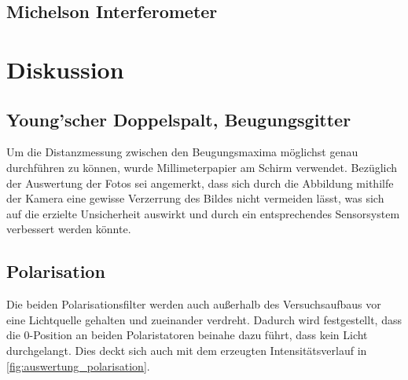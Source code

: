 \documentclass[12pt,english,ngerman]{scrartcl}
\begin{document}

\subsection{Michelson Interferometer}


\section{Diskussion}\label{sec:diskussion}

\subsection{Young'scher Doppelspalt, Beugungsgitter}

Um die Distanzmessung zwischen den Beugungsmaxima möglichst genau durchführen zu können, wurde Millimeterpapier am Schirm 
verwendet. Bezüglich der Auswertung der Fotos sei angemerkt, dass sich durch die Abbildung mithilfe der Kamera eine gewisse 
Verzerrung des Bildes nicht vermeiden lässt, was sich auf die erzielte Unsicherheit auswirkt und durch ein entsprechendes 
Sensorsystem verbessert werden könnte.

\subsection{Polarisation}

Die beiden Polarisationsfilter werden auch außerhalb des Versuchsaufbaus vor eine Lichtquelle gehalten und 
zueinander verdreht. Dadurch wird festgestellt, dass die 0-Position an beiden Polaristatoren beinahe dazu führt, dass 
kein Licht durchgelangt. Dies deckt sich auch mit dem erzeugten Intensitätsverlauf in \autoref{fig:auswertung_polarisation}.
\end{document}

